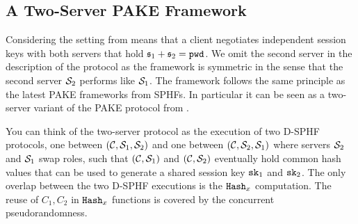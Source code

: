
\subsection{A Two-Server PAKE Framework}
Considering the setting from \citet{Katz2012a} means that a client negotiates independent session keys with both servers that hold $\mathfrak{s}_1+\mathfrak{s}_2=\mathtt{pwd}$.
We omit the second server in the description of the protocol as the framework is symmetric in the sense that the second server $\mathcal{S}_2$ performs like $\mathcal{S}_1$.
The framework follows the same principle as the latest \ac{PAKE} frameworks from \acp{SPHF}.
In particular it can be seen as a two-server variant of the \ac{PAKE} protocol from \citet{Katz2011}.

You can think of the two-server protocol as the execution of two \ac{D-SPHF} protocols, one between $(\mathcal{C},\mathcal{S}_1,\mathcal{S}_2)$ and one between $(\mathcal{C},\mathcal{S}_2,\mathcal{S}_1)$ where servers $\mathcal{S}_2$ and $\mathcal{S}_1$ swap roles, such that $(\mathcal{C},\mathcal{S}_1)$ and $(\mathcal{C},\mathcal{S}_2)$ eventually hold common hash values that can be used to generate a shared session key $\mathtt{sk}_1$ and $\mathtt{sk}_2$.
The only overlap between the two \ac{D-SPHF} executions is the $\mathtt{Hash}_x$ computation.
The reuse of $C_1,C_2$ in $\mathtt{Hash}_x$ functions is covered by the concurrent pseudorandomness.

